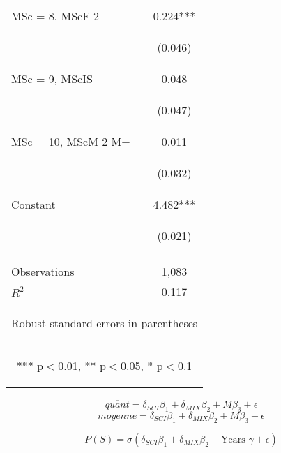 \documentclass{article} %
\begin{document}
\begin{table}[H]
\begin{center}
\begin{tabular}{lc}
MSc = 8, MScF 2 & 0.224*** \\
\vspace{4pt} & \begin{footnotesize}(0.046)\end{footnotesize} \\
MSc = 9, MScIS & 0.048 \\
\vspace{4pt} & \begin{footnotesize}(0.047)\end{footnotesize} \\
MSc = 10, MScM 2 M+ & 0.011 \\
\vspace{4pt} & \begin{footnotesize}(0.032)\end{footnotesize} \\
Constant & 4.482*** \\
 & \begin{footnotesize}(0.021)\end{footnotesize} \\
\vspace{4pt} & \begin{footnotesize}\end{footnotesize} \\
Observations & 1,083 \\
 $R^2$ & 0.117 \\ \hline
\multicolumn{2}{c}{\begin{footnotesize} Robust standard errors in parentheses\end{footnotesize}} \\
\multicolumn{2}{c}{\begin{footnotesize} *** p$<$0.01, ** p$<$0.05, * p$<$0.1\end{footnotesize}} \\
\end{tabular}
\end{center}

\end{table}

$$
\overline{quant} = \delta_{SCI} \beta_1 +  \delta_{MIX} \beta_2 + M \beta_3 + \epsilon
$$
$$
moyenne = \delta_{SCI} \beta_1 +  \delta_{MIX} \beta_2 + M \beta_3 + \epsilon
$$

$$
P(S) = \sigma (\delta_{SCI} \beta_1 +  \delta_{MIX} \beta_2 + \text{Years } \gamma + \epsilon)
$$
\end{document}

